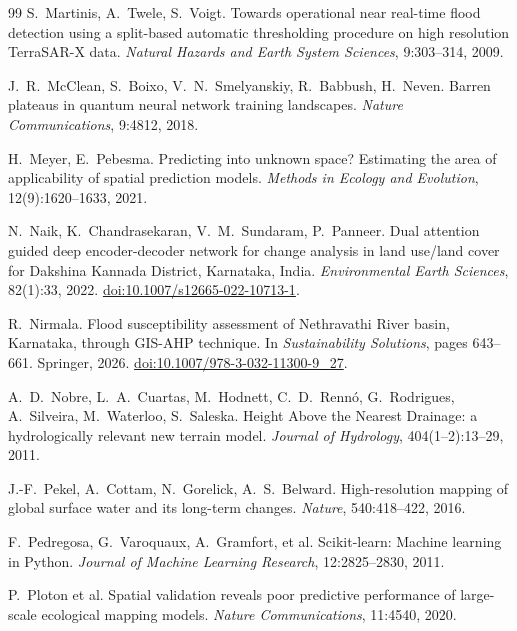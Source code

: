 \documentclass[11pt,a4paper]{article}
\begin{document}
\begin{thebibliography}{99}
S.~Martinis, A.~Twele, S.~Voigt.
Towards operational near real-time flood detection using a split-based automatic
thresholding procedure on high resolution TerraSAR-X data.
\emph{Natural Hazards and Earth System Sciences}, 9:303--314, 2009.

J.~R.~McClean, S.~Boixo, V.~N.~Smelyanskiy, R.~Babbush, H.~Neven.
Barren plateaus in quantum neural network training landscapes.
\emph{Nature Communications}, 9:4812, 2018.

H.~Meyer, E.~Pebesma.
Predicting into unknown space? Estimating the area of applicability of spatial
prediction models.
\emph{Methods in Ecology and Evolution}, 12(9):1620--1633, 2021.

N.~Naik, K.~Chandrasekaran, V.~M.~Sundaram, P.~Panneer.
Dual attention guided deep encoder-decoder network for change analysis in land
use/land cover for Dakshina Kannada District, Karnataka, India.
\emph{Environmental Earth Sciences}, 82(1):33, 2022.
\href{https://doi.org/10.1007/s12665-022-10713-1}{doi:10.1007/s12665-022-10713-1}.

R.~Nirmala.
Flood susceptibility assessment of Nethravathi River basin, Karnataka, through
GIS-AHP technique.
In \emph{Sustainability Solutions}, pages 643--661. Springer, 2026.
\href{https://doi.org/10.1007/978-3-032-11300-9_27}{doi:10.1007/978-3-032-11300-9\_27}.

A.~D.~Nobre, L.~A.~Cuartas, M.~Hodnett, C.~D.~Renn\'o, G.~Rodrigues, A.~Silveira,
M.~Waterloo, S.~Saleska.
Height Above the Nearest Drainage: a hydrologically relevant new terrain model.
\emph{Journal of Hydrology}, 404(1--2):13--29, 2011.

J.-F.~Pekel, A.~Cottam, N.~Gorelick, A.~S.~Belward.
High-resolution mapping of global surface water and its long-term changes.
\emph{Nature}, 540:418--422, 2016.

F.~Pedregosa, G.~Varoquaux, A.~Gramfort, et al.
Scikit-learn: Machine learning in Python.
\emph{Journal of Machine Learning Research}, 12:2825--2830, 2011.

P.~Ploton et al.
Spatial validation reveals poor predictive performance of large-scale ecological
mapping models.
\emph{Nature Communications}, 11:4540, 2020.


\end{thebibliography}
\end{document}
